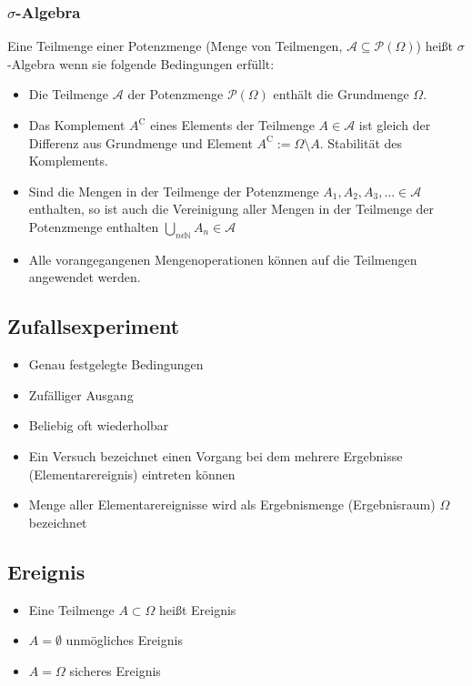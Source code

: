 \documentclass[12pt]{article}
\begin{document}
\subsubsection{$\sigma$-Algebra}
Eine Teilmenge einer Potenzmenge (Menge von Teilmengen, $\mathcal{A}\subseteq\mathcal{P}(\Omega)$) heißt $\sigma$-Algebra wenn sie folgende Bedingungen erfüllt:
\begin{itemize}
	\item Die Teilmenge $\mathcal{A}$ der Potenzmenge $\mathcal{P}(\Omega)$ enthält die Grundmenge $\Omega$.
	\item Das Komplement $A^\mathrm{C}$ eines Elements der Teilmenge $A \in\mathcal{A}$ ist gleich der Differenz aus Grundmenge und Element $A^\mathrm{C} := \Omega\setminus A$. Stabilität des Komplements.
	\item Sind die Mengen in der Teilmenge der Potenzmenge $A_1,A_2,A_3,... \in \mathcal{A}$ enthalten, so ist auch die Vereinigung aller Mengen in der Teilmenge der Potenzmenge enthalten $\bigcup\limits_{n\epsilon \mathbb{N}}A_n \in \mathcal{A}$
	\item Alle vorangegangenen Mengenoperationen können auf die Teilmengen angewendet werden. 
\end{itemize}

\subsection{Zufallsexperiment}
\begin{itemize}
	\item Genau festgelegte Bedingungen
	\item Zufälliger Ausgang
	\item Beliebig oft wiederholbar
	\item Ein Versuch bezeichnet einen Vorgang bei dem mehrere Ergebnisse (Elementarereignis) eintreten können
	\item Menge aller Elementarereignisse wird als Ergebnismenge (Ergebnisraum) $\Omega$ bezeichnet
\end{itemize}
\subsection{Ereignis}
\begin{itemize}
	\item Eine Teilmenge $A \subset \Omega$ heißt Ereignis
	\item $A = \emptyset$ unmögliches Ereignis
	\item $A = \Omega$ sicheres Ereignis
\end{itemize}
\end{document}
